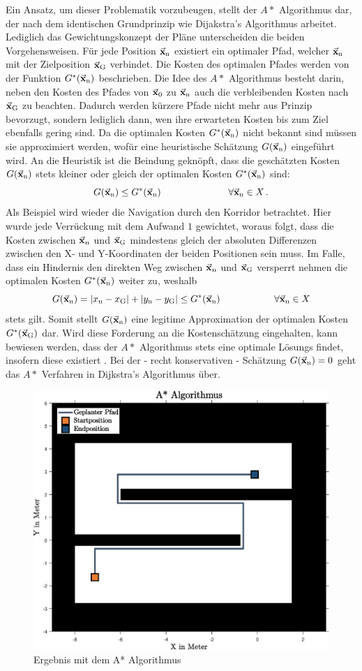 Ein Ansatz, um dieser Problematik vorzubeugen, stellt der $A*$ Algorithmus dar, der nach dem identischen Grundprinzip wie Dijakstra's Algorithmus arbeitet. Lediglich das Gewichtungskonzept der Pläne unterscheiden die beiden Vorgehensweisen. Für jede Position $\vec{\mathbf{x}}_{\text{n}}$ existiert ein optimaler Pfad, welcher $\vec{\mathbf{x}}_{\text{n}}$ mit der Zielposition $\vec{\mathbf{x}}_{\text{G}}$ verbindet. Die Kosten des optimalen Pfades werden von der Funktion $G^*(\vec{\mathbf{x}}_{\text{n}})$ beschrieben. Die Idee des $A*$ Algorithmus besteht darin, neben den Kosten des Pfades von $\vec{\mathbf{x}}_{\text{0}}$ zu $\vec{\mathbf{x}}_{\text{n}}$ auch die verbleibenden Kosten nach $\vec{\mathbf{x}}_{\text{G}}$ zu beachten. Dadurch werden kürzere Pfade nicht mehr aus Prinzip bevorzugt, sondern lediglich dann, wen ihre erwarteten Kosten bis zum Ziel ebenfalls gering sind. Da die optimalen Kosten $G^*(\vec{\mathbf{x}}_{\text{n}})$ nicht bekannt sind müssen sie approximiert werden, wofür eine heuristische Schätzung $G(\vec{\mathbf{x}}_{\text{n}})$ eingeführt wird. An die Heuristik ist die Beindung geknöpft, dass die geschätzten Kosten $G(\vec{\mathbf{x}}_{\text{n}})$ stets kleiner oder gleich der optimalen Kosten $G^*(\vec{\mathbf{x}}_{\text{n}})$ sind:
\begin{equation}
G(\vec{\mathbf{x}}_{\text{n}}) \leq G^*(\vec{\mathbf{x}}_{\text{n}}) \hspace{2.5cm} \forall \vec{\mathbf{x}}_{\text{n}} \in X\,.
\end{equation}
Als Beispiel wird wieder die Navigation durch den Korridor betrachtet. Hier wurde jede Verrückung mit dem Aufwand $1$ gewichtet, woraus folgt, dass die Kosten zwischen $\vec{\mathbf{x}}_{\text{n}}$ und $\vec{\mathbf{x}}_{\text{G}}$ mindestens gleich der absoluten Differenzen zwischen den X- und Y-Koordinaten der beiden Positionen sein muss. Im Falle, dass ein Hindernis den direkten Weg zwischen $\vec{\mathbf{x}}_{\text{n}}$ und $\vec{\mathbf{x}}_{\text{G}}$ versperrt nehmen die optimalen Kosten $G^*(\vec{\mathbf{x}}_{\text{n}})$ weiter zu, weshalb
\begin{equation}
G(\vec{\mathbf{x}}_{\text{n}}) = \vert x_{\text{n}} - x_{\text{G}}\vert + \vert y_{\text{n}} - y_{\text{G}}\vert \leq G^*(\vec{\mathbf{x}}_{\text{n}}) \hspace{2cm} \forall \vec{\mathbf{x}}_{\text{n}} \in X
\end{equation}
stets gilt. Somit stellt $G(\vec{\mathbf{x}}_{\text{n}})$ eine legitime Approximation der optimalen Kosten $G^*(\vec{\mathbf{x}}_{\text{G}})$ dar. Wird diese Forderung an die Kostenschätzung eingehalten, kann bewiesen werden, dass der $A*$ Algorithmus stets eine optimale Lösungs findet, insofern diese existiert \cite[S. 32]{PlanAlgo}\cite{SecRef1,SecRef2}. Bei der - recht konservativen - Schätzung $G(\vec{\mathbf{x}}_{\text{n}})=0$ geht das $A*$ Verfahren in Dijkstra's Algorithmus über.
\begin{figure}[ht!]
\centering
\includegraphics[width=0.5\linewidth]{img/KorridorBeispiel_img7.eps}
\caption{Ergebnis mit dem A* Algorithmus}
\end{figure}